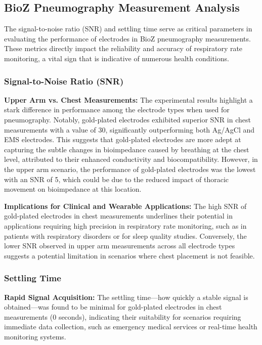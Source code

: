 \documentclass[conference]{IEEEtran}
\begin{document}
\subsection{BioZ Pneumography Measurement Analysis}

The signal-to-noise ratio (SNR) and settling time serve as critical parameters in evaluating the performance of electrodes in BioZ pneumography measurements. These metrics directly impact the reliability and accuracy of respiratory rate monitoring, a vital sign that is indicative of numerous health conditions.

\subsubsection{Signal-to-Noise Ratio (SNR)}

\textbf{Upper Arm vs. Chest Measurements:} The experimental results highlight a stark difference in performance among the electrode types when used for pneumography. Notably, gold-plated electrodes exhibited superior SNR in chest measurements with a value of 30, significantly outperforming both Ag/AgCl and EMS electrodes. This suggests that gold-plated electrodes are more adept at capturing the subtle changes in bioimpedance caused by breathing at the chest level, attributed to their enhanced conductivity and biocompatibility. However, in the upper arm scenario, the performance of gold-plated electrodes was the lowest with an SNR of 5, which could be due to the reduced impact of thoracic movement on bioimpedance at this location.

\textbf{Implications for Clinical and Wearable Applications:} The high SNR of gold-plated electrodes in chest measurements underlines their potential in applications requiring high precision in respiratory rate monitoring, such as in patients with respiratory disorders or for sleep quality studies. Conversely, the lower SNR observed in upper arm measurements across all electrode types suggests a potential limitation in scenarios where chest placement is not feasible.

\subsubsection{Settling Time}

\textbf{Rapid Signal Acquisition:} The settling time—how quickly a stable signal is obtained—was found to be minimal for gold-plated electrodes in chest measurements (0 seconds), indicating their suitability for scenarios requiring immediate data collection, such as emergency medical services or real-time health monitoring systems.
\end{document}
